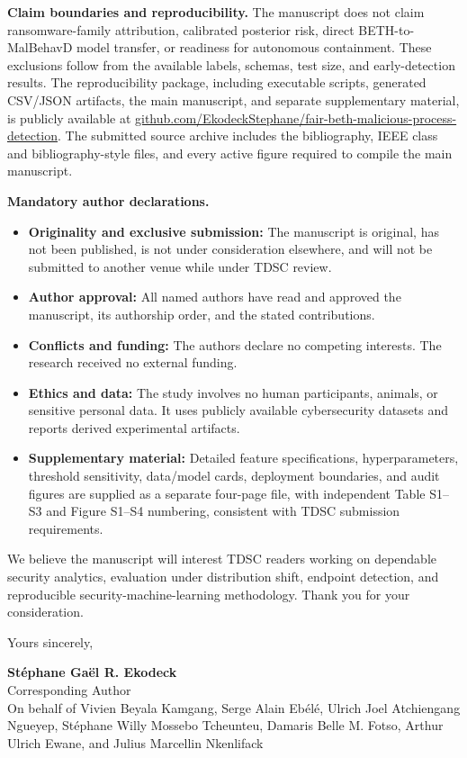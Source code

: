 \documentclass[11pt]{article}
\begin{document}
\textbf{Claim boundaries and reproducibility.}
The manuscript does not claim ransomware-family attribution, calibrated
posterior risk, direct BETH-to-MalBehavD model transfer, or readiness for
autonomous containment. These exclusions follow from the available labels,
schemas, test size, and early-detection results. The reproducibility package,
including executable scripts, generated CSV/JSON artifacts, the main
manuscript, and separate supplementary material, is publicly available at
\href{https://github.com/EkodeckStephane/fair-beth-malicious-process-detection}
{github.com/EkodeckStephane/fair-beth-malicious-process-detection}. The
submitted source archive includes the bibliography, IEEE class and
bibliography-style files, and every active figure required to compile the
main manuscript.

\textbf{Mandatory author declarations.}
\begin{itemize}
    \item \textbf{Originality and exclusive submission:} The manuscript is
    original, has not been published, is not under consideration elsewhere,
    and will not be submitted to another venue while under TDSC review.
    \item \textbf{Author approval:} All named authors have read and approved
    the manuscript, its authorship order, and the stated contributions.
    \item \textbf{Conflicts and funding:} The authors declare no competing
    interests. The research received no external funding.
    \item \textbf{Ethics and data:} The study involves no human participants,
    animals, or sensitive personal data. It uses publicly available
    cybersecurity datasets and reports derived experimental artifacts.
    \item \textbf{Supplementary material:} Detailed feature specifications,
    hyperparameters, threshold sensitivity, data/model cards, deployment
    boundaries, and audit figures are supplied as a separate four-page file,
    with independent Table S1--S3 and Figure S1--S4 numbering, consistent with
    TDSC submission requirements.
\end{itemize}

We believe the manuscript will interest TDSC readers working on dependable
security analytics, evaluation under distribution shift, endpoint detection,
and reproducible security-machine-learning methodology. Thank you for your
consideration.

\vspace{4pt}
Yours sincerely,

\vspace{15pt}

\textbf{St\'{e}phane Ga\"{e}l R. Ekodeck}\\
Corresponding Author\\
On behalf of Vivien Beyala Kamgang, Serge Alain Eb\'{e}l\'{e}, Ulrich Joel
Atchiengang Ngueyep, St\'{e}phane Willy Mossebo Tcheunteu, Damaris Belle M.
Fotso, Arthur Ulrich Ewane, and Julius Marcellin Nkenlifack
\end{document}
